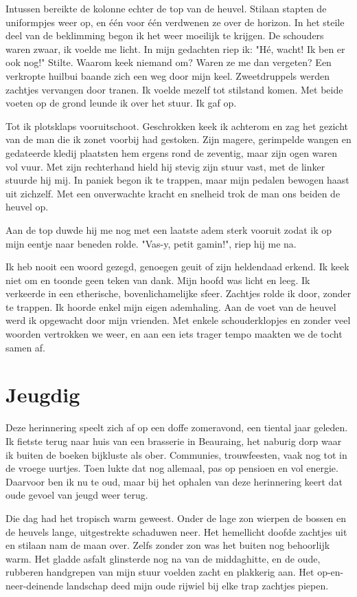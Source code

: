 \documentclass[12pt, justified, a4paper, symmetric]{tufte-book}
\begin{document}
Intussen bereikte de kolonne echter de top van de heuvel. Stilaan stapten de uniformpjes weer op, en \'e\'en voor \'e\'en verdwenen ze over de horizon. In het steile deel van de beklimming begon ik het weer moeilijk te krijgen. De schouders waren zwaar, ik voelde me licht. In mijn gedachten riep ik: "H\'e, wacht! Ik ben er ook nog!" Stilte. Waarom keek niemand om? Waren ze me dan vergeten? Een verkropte huilbui baande zich een weg door mijn keel. Zweetdruppels werden zachtjes vervangen door tranen. Ik voelde mezelf tot stilstand komen. Met beide voeten op de grond leunde ik over het stuur. Ik gaf op.

Tot ik plotsklaps vooruitschoot. Geschrokken keek ik achterom en zag het gezicht van de man die ik zonet voorbij had gestoken. Zijn magere, gerimpelde wangen en gedateerde kledij plaatsten hem ergens rond de zeventig, maar zijn ogen waren vol vuur. Met zijn rechterhand hield hij stevig zijn stuur vast, met de linker stuurde hij mij. In paniek begon ik te trappen, maar mijn pedalen bewogen haast uit zichzelf. Met een onverwachte kracht en snelheid trok de man ons beiden de heuvel op.

Aan de top duwde hij me nog met een laatste adem sterk vooruit zodat ik op mijn eentje naar beneden rolde. "Vas-y, petit gamin!", riep hij me na.

Ik heb nooit een woord gezegd, genoegen geuit of zijn heldendaad erkend. Ik keek niet om en toonde geen teken van dank. Mijn hoofd was licht en leeg. Ik verkeerde in een etherische, bovenlichamelijke sfeer. Zachtjes rolde ik door, zonder te trappen. Ik hoorde enkel mijn eigen ademhaling. Aan de voet van de heuvel werd ik opgewacht door mijn vrienden. Met enkele schouderklopjes en zonder veel woorden vertrokken we weer, en aan een iets trager tempo maakten we de tocht samen af.

\newpage
\section{Jeugdig}
Deze herinnering speelt zich af op een doffe zomeravond, een tiental jaar geleden. Ik fietste terug naar huis van een brasserie in Beauraing, het naburig dorp waar ik buiten de boeken bijkluste als ober. Communies, trouwfeesten, vaak nog tot in de vroege uurtjes. Toen lukte dat nog allemaal, pas op pensioen en vol energie. Daarvoor ben ik nu te oud, maar bij het ophalen van deze herinnering keert dat oude gevoel van jeugd weer terug.

Die dag had het tropisch warm geweest. Onder de lage zon wierpen de bossen en de heuvels lange, uitgestrekte schaduwen neer. Het hemellicht doofde zachtjes uit en stilaan nam de maan over. Zelfs zonder zon was het buiten nog behoorlijk warm. Het gladde asfalt glinsterde nog na van de middaghitte, en de oude, rubberen handgrepen van mijn stuur voelden zacht en plakkerig aan. Het op-en-neer-deinende landschap deed mijn oude rijwiel bij elke trap zachtjes piepen.
\end{document}
